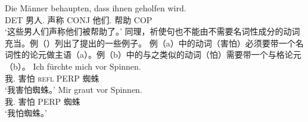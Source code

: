 \ea
\gll Die Männer behaupten, dass ihnen geholfen wird.\\
	 DET 男人.\nom{} 声称 CONJ 他们.\dat{} 帮助 COP\\
\glt `这些男人们声称他们被帮助了。'
\z
%
同理，祈使句也不能由不需要名词性成分的动词充当。例（）列出了\citet[]{Reis82}提出的一些例子。
\eal
{}
\zl
例（a）中的动词（害怕）必须要带一个名词性的论元做主语（a）。例（b）中的与之类似的动词（怕）需要带一个与格论元（b）。
\eal
\ex
\gll Ich fürchte mich vor Spinnen.\\
	 我.\nom{} 害怕 \textsc{refl} PERP 蜘蛛\\
\glt `我害怕蜘蛛。'
\ex 
\gll Mir graut vor Spinnen.\\
	 我.\dat{} 害怕 PERP 蜘蛛\\
\glt `我怕蜘蛛。'
\zl

